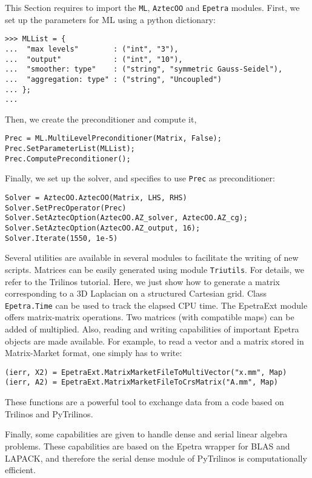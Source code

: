 \documentclass[10pt,relax]{SANDreport}
\begin{document}
This Section requires to import the {\tt ML}, {\tt AztecOO} and {\tt Epetra}
modules. First, we set up the parameters for ML using a python dictionary:
\begin{verbatim}
>>> MLList = {
...  "max levels"        : ("int", "3"),
...  "output"            : ("int", "10"),
...  "smoother: type"    : ("string", "symmetric Gauss-Seidel"),
...  "aggregation: type" : ("string", "Uncoupled")
... };
... 
\end{verbatim}
Then, we create the preconditioner and compute it,
\begin{verbatim}
Prec = ML.MultiLevelPreconditioner(Matrix, False);
Prec.SetParameterList(MLList);
Prec.ComputePreconditioner();
\end{verbatim}
Finally, we set up the solver, and specifies to use \verb!Prec! as
preconditioner:
\begin{verbatim}
Solver = AztecOO.AztecOO(Matrix, LHS, RHS)
Solver.SetPrecOperator(Prec)
Solver.SetAztecOption(AztecOO.AZ_solver, AztecOO.AZ_cg);
Solver.SetAztecOption(AztecOO.AZ_output, 16);
Solver.Iterate(1550, 1e-5)
\end{verbatim}

\bigskip

Several utilities are available in several modules to facilitate the writing
of new scripts.
Matrices can be easily generated using module {\tt Triutils}. For
details, we refer to the Trilinos tutorial. Here, we just show how to generate
a matrix corresponding to a 3D Laplacian on a structured Cartesian grid.
Class {\tt Epetra.Time} can be used to track the elapsed CPU time.
The EpetraExt module offers matrix-matrix operations. Two matrices
(with compatible maps) can be added of multiplied. Also, reading and writing
capabilities of important Epetra objects are made available. For example, to
read a vector and a matrix stored in Matrix-Market format, one simply has to
write:
\begin{verbatim}
(ierr, X2) = EpetraExt.MatrixMarketFileToMultiVector("x.mm", Map)
(ierr, A2) = EpetraExt.MatrixMarketFileToCrsMatrix("A.mm", Map)
\end{verbatim}
These functions are a powerful tool to exchange data from a code based on
Trilinos and PyTrilinos.

Finally, some
capabilities are given to handle dense and serial linear algebra problems.
These capabilities are based on the Epetra wrapper for BLAS and LAPACK, and
therefore the serial dense module of PyTrilinos is computationally efficient.
\end{document}
